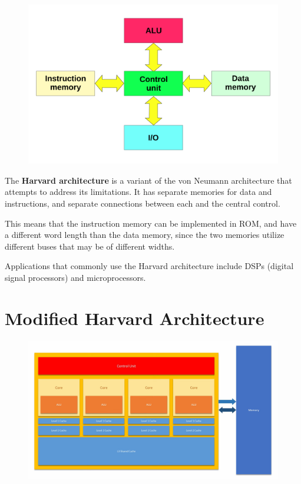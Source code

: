 \begin{figure}[h!]
	\includegraphics[scale=0.5]{./img/Harvard-architecture.png}
\end{figure}

The \textbf{Harvard architecture} is a variant of the von Neumann architecture that attempts to address its limitations. It has separate memories for data and instructions, and separate connections between each and the central control.

This means that the instruction memory can be implemented in ROM, and have a different word length than the data memory, since the two memories utilize different buses that may be of different widths.

Applications that commonly use the Harvard architecture include DSPs (digital signal processors) and microprocessors.

\section{Modified Harvard Architecture}

\begin{figure}[h!]
	\includegraphics[scale=0.5]{./img/modified-Harvard.png}
\end{figure}

